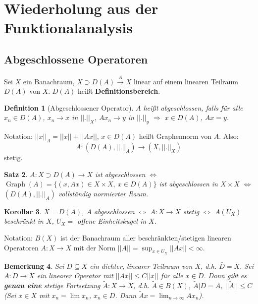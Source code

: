 \documentclass[11pt,a4paper,titlepage, ngerman]{scrartcl}
\newtheorem{Satz}{Satz}[section]
\newtheorem{Definition}[Satz]{Definition}
\newtheorem{Bemerkung}[Satz]{Bemerkung}
\newtheorem{Korollar}[Satz]{Korollar}
\DeclareMathOperator{\Graph}{Graph}
\numberwithin{equation}{section}
\begin{document}
	\newpage	
	\tableofcontents
	\newpage
	\section{Wiederholung aus der Funktionalanalysis}
	
	\subsection{Abgeschlossene Operatoren}
	
	Sei $X$ ein Banachraum, $X\supset D(A)\overset{A}{\rightarrow} X$ linear auf einem linearen Teilraum $D(A)$ von $X$. $D(A)$ heißt \textbf{Definitionsbereich}. 
	
	\begin{Definition}[Abgeschlossener Operator]
		$A$ heißt abgeschlossen, falls für alle $x_n\in D(A)$, $x_n\rightarrow x$ in $||.||_X$, $Ax_n\rightarrow y$ in $||.||_y$ $\Rightarrow$ $x\in D(A)$, $Ax= y$.
	\end{Definition}
	
	Notation: $||x||_A = ||x||+||Ax||$, $x\in D(A)$ heißt Graphennorm von $A$. Also: 
	$$A:(D(A),||.||_A)\rightarrow (X,||.||_X)$$
	stetig.
	
	\begin{Satz}
		$A:X\supset D(A)\rightarrow X$ ist abgeschlossen $\Leftrightarrow$ $\Graph(A) = \{(x,Ax)\in X\times X,~ x\in D(A) \}$ ist abgeschlossen in $X\times X$ $\Leftrightarrow$ $(D(A),||.||_A)$ vollständig normierter Raum.
	\end{Satz}
	
	\begin{Korollar}
		$X = D(A)$, $A$ abgeschlossen $\Leftrightarrow$ $A:X\rightarrow X$ stetig $\Leftrightarrow$ $A(U_X)$ beschränkt in $X$, $U_X = $ offene Einheitskugel in $X$.
	\end{Korollar}
	
	Notation: $B(X)$ ist der Banachraum aller beschränkten/stetigen linearen Operatoren $A:X\rightarrow X$ mit der Norm $||A|| = \sup_{x\in U_X}||Ax|| <\infty$.
	
	\begin{Bemerkung}
		Sei $D\subseteq X$ ein dichter, linearer Teilraum von $X$, d.h. $\bar{D} = X$. Sei $A:D\rightarrow X$ ein linearer Operator mit $||Ax||\leq C||x||$ für alle $x\in D$. Dann gibt es \textbf{genau eine} stetige Fortsetzung $\tilde{A}: X\rightarrow X$, d.h. $\tilde{A}\in B(X)$, $\tilde{A}|D = A$, $||\tilde{A}||\leq C$ (Sei $x\in X$ mit $x_n=\lim x_n$, $x_n\in D$. Dann $\tilde{A}x=\lim_{n\rightarrow\infty} Ax_n$).
	\end{Bemerkung}
	
\end{document}
